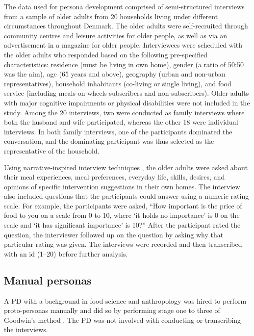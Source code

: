 The data used for persona development comprised of semi-structured interviews from a sample of older adults from 20 households living under different circumstances throughout Denmark. The older adults were self-recruited through community centres and leisure activities for older people, as well as via an advertisement in a magazine for older people. Interviewees were scheduled with the older adults who responded based on the following pre-specified characteristics: residence (must be living in own home), gender (a ratio of 50:50 was the aim), age (65 years and above), geography (urban and non-urban representatives), household inhabitants (co-living or single living), and food service (including meals-on-wheels subscribers and non-subscribers). Older adults with major cognitive impairments or physical disabilities were not included in the study. Among the 20 interviews, two were conducted as family interviews where both the husband and wife participated, whereas the other 18 were individual interviews. In both family interviews, one of the participants dominated the conversation, and the dominating participant was thus selected as the representative of the household.

Using narrative-inspired interview techniques \citep{Jovchelovitch2000}, the older adults were asked about their meal experiences, meal preferences, everyday life, skills, desires, and opinions of specific intervention suggestions in their own homes. The interview also included questions that the participants could answer using a numeric rating scale. For example, the participants were asked, ``How important is the price of food to you on a scale from 0 to 10, where `it holds no importance' is 0 on the scale and `it has significant importance' is 10?'' After the participant rated the question, the interviewer followed up on the question by asking why that particular rating was given. The interviews were recorded and then transcribed with an id (1--20) before further analysis.

\subsection{Manual personas}

A PD with a background in food science and anthropology was hired to perform proto-personas manually and did so by performing stage one to three of Goodwin's method \citep{Cooper2007, Goodwin2002}. The PD was not involved with conducting or transcribing the interviews.

